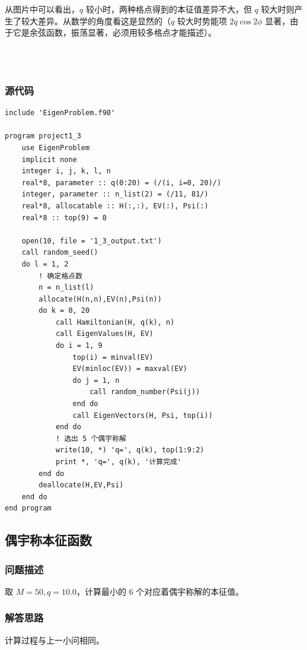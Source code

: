 \documentclass{ctexart}
\begin{document}
从图片中可以看出，$q$ 较小时，两种格点得到的本征值差异不大，但 $q$ 较大时则产生了较大差异。从数学的角度看这是显然的（$q$ 较大时势能项 $2q\cos2\phi$ 显著，由于它是余弦函数，振荡显著，必须用较多格点才能描述）。

~\\
~\\
\subsubsection{源代码}
\begin{lstlisting}
include 'EigenProblem.f90'

program project1_3
    use EigenProblem
    implicit none
    integer i, j, k, l, n
    real*8, parameter :: q(0:20) = (/(i, i=0, 20)/)
    integer, parameter :: n_list(2) = (/11, 81/)
    real*8, allocatable :: H(:,:), EV(:), Psi(:)
    real*8 :: top(9) = 0

    open(10, file = '1_3_output.txt')
    call random_seed()
    do l = 1, 2
        ! 确定格点数
        n = n_list(l)
        allocate(H(n,n),EV(n),Psi(n))
        do k = 0, 20
            call Hamiltonian(H, q(k), n)
            call EigenValues(H, EV)
            do i = 1, 9
                top(i) = minval(EV)
                EV(minloc(EV)) = maxval(EV)
                do j = 1, n
                    call random_number(Psi(j))
                end do
                call EigenVectors(H, Psi, top(i))
            end do
            ! 选出 5 个偶宇称解
            write(10, *) 'q=', q(k), top(1:9:2)
            print *, 'q=', q(k), '计算完成'
        end do
        deallocate(H,EV,Psi)
    end do
end program
\end{lstlisting}
\subsection{偶宇称本征函数}
\subsubsection{问题描述}
取 $M=50,q=10.0$，计算最小的 6 个对应着偶宇称解的本征值。
\subsubsection{解答思路}
计算过程与上一小问相同。
\end{document}
